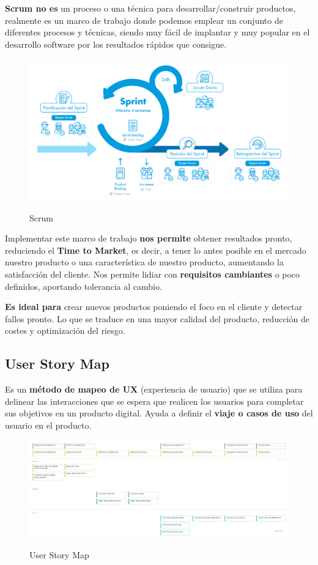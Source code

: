\documentclass[12pt,twoside,titlepage]{report}
\begin{document}
\textbf{Scrum no es} un proceso o una técnica para desarrollar/construir productos, realmente es un marco de trabajo donde podemos emplear un conjunto de diferentes procesos y técnicas, siendo muy fácil de implantar y muy popular en el desarrollo software por los resultados rápidos que consigue.

\begin{figure}[H]
    \centering
    \includegraphics[scale=0.39]{Scrum/Scrum}
    \label{fig:Scrum}
    \caption{Scrum}
\end{figure}

Implementar este marco de trabajo \textbf{nos permite} obtener resultados pronto, reduciendo el \textbf{Time to Market}, es decir, a tener lo antes posible en el mercado nuestro producto o una característica de nuestro producto, aumentando la satisfacción del cliente. Nos permite lidiar con \textbf{requisitos cambiantes} o poco definidos, aportando tolerancia al cambio.

\textbf{Es ideal para} crear nuevos productos poniendo el foco en el cliente y detectar fallos pronto. Lo que se traduce en una mayor calidad del producto, reducción de costes y optimización del riesgo.

\subsection{User Story Map}

Es un \textbf{método de mapeo de UX} (experiencia de usuario) que se utiliza para delinear las interacciones que se espera que realicen los usuarios para completar sus objetivos en un producto digital. Ayuda a definir el \textbf{viaje o casos de uso} del usuario en el producto.

\begin{figure}[H]
    \centering
    \includegraphics[scale=0.25]{Scrum/UserStoryMap}
    \label{fig:UserStoryMap}
    \caption{User Story Map}
\end{figure}
\end{document}
